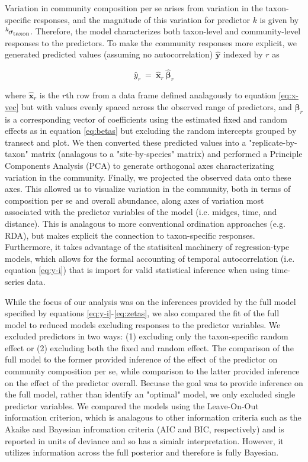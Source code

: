 {Variation in community composition per se arises from variation in the taxon-specific responses, and the magnitude of this
variation for predictor $k$ is given by ${}^k\hspace*{-1pt}\sigma_\text{taxon}$. Therefore, the model characterizes both
taxon-level and community-level responses to the predictors. To make the community responses more explicit, we
generated predicted values (assuming no autocorrelation) $\hat{\mathbf{y}}$ indexed by $r$ as

\begin{equation} \label{eq:preds}
\hat{y}_r~=~\hat{\mathbf{x}}_r~\hat{{\boldsymbol\beta}}_r
\end{equation}

\noindent where $\hat{\mathbf{x}}_r$ is the $r$th row from a data frame defined analagously to equation \ref{eq:x-vec} but
with values evenly spaced across the observed range of predictors, and $\hat{{\boldsymbol\beta}}_r$ is a
corresponding vector of coefficients using the estimated fixed and random effects as in equation \ref{eq:betas}
but excluding the random intercepts grouped by transect and plot. We then converted these predicted values into a
"replicate-by-taxon" matrix (analagous to a "site-by-species" matrix) and performed a Principle Components Analysis (PCA)
to generate orthogonal axes characterizating variation in the community. Finally, we projected the observed data onto these
axes. This allowed us to visualize variation in the community, both in terms of composition per se and overall abundance,
along axes of variation most associated with the predictor variables of the model (i.e. midges, time, and distance). This
is analagous to more conventional ordination approaches (e.g. RDA), but makes explicit the connection to taxon-specific
responses. Furthermore, it takes advantage  of the statisitcal machinery of regression-type models, which allows for the
formal accounting of temporal autocorrelation (i.e. equation \ref{eq:y-i}) that is import for valid statistical inference
when using time-series data.

While the focus of our analysis was on the inferences provided by the full model specified by equations \ref{eq:y-i}-\ref{eq:zetas},
we also compared the fit of the full model to reduced models excluding responses to the predictor variables. We excluded predictors
in two ways: (1) excluding only the taxon-specific random effect or (2) excluding both the fixed and random effect. The comparison
of the full model to the former provided inference of the effect of the predictor on community composition per se, while comparison
to the latter provided inference on the effect of the predictor overall. Becuase the goal was to provide inference on the full
model, rather than identify an "optimal" model, we only excluded single predictor variables. We compared the models using the
Leave-On-Out information criterion, which is analagous to other information criteria such as the Akaike and Bayesian infromation
criteria (AIC and BIC, respectively) and is reported in units of deviance and so has a simialr interpretation. However, it utilizes
information across the full posterior and therefore is fully Bayesian.

}
